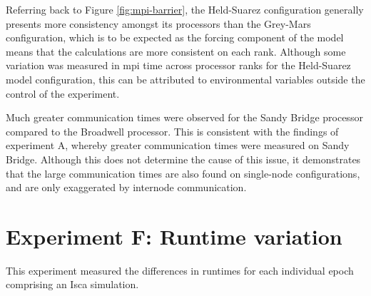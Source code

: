 \documentclass[a4paper,11pt]{report}
\begin{document}
\par
Referring back to Figure \ref{fig:mpi-barrier}, the Held-Suarez configuration generally presents more consistency amongst its processors than the Grey-Mars configuration, which is to be expected as the forcing component of the model means that the calculations are more consistent on each rank. Although some variation was measured in \gls{mpi} time across processor ranks for the Held-Suarez model configuration, this can be attributed to environmental variables outside the control of the experiment. 
\par
Much greater communication times were observed for the Sandy Bridge processor compared to the Broadwell processor. This is consistent with the findings of experiment A, whereby greater communication times were measured on Sandy Bridge. Although this does not determine the cause of this issue, it demonstrates that the large communication times are also found on single-node configurations, and are only exaggerated by internode communication.
\par


\section{Experiment F: Runtime variation}
This experiment measured the differences in runtimes for each individual epoch comprising an Isca simulation.
\end{document}
